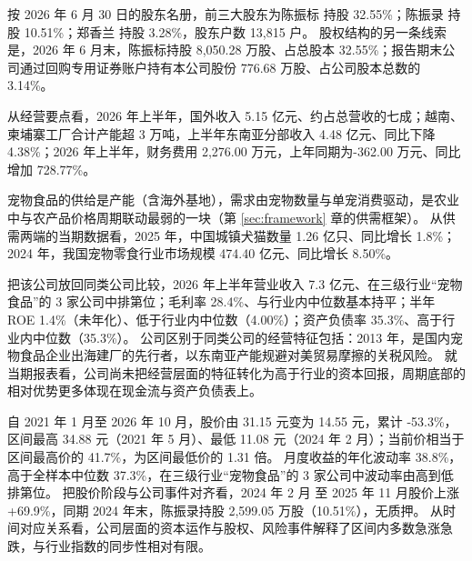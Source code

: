  按 2026 年 6 月 30 日的股东名册，前三大股东为陈振标 持股 32.55\%；陈振录 持股 10.51\%；郑香兰 持股 3.28\%，股东户数 13,815 户。 股权结构的另一条线索是，2026 年 6 月末，陈振标持股 8,050.28 万股、占总股本 32.55\%；报告期末公司通过回购专用证券账户持有本公司股份 776.68 万股、占公司股本总数的 3.14\%。

 从经营要点看，2026 年上半年，国外收入 5.15 亿元、约占总营收的七成；越南、柬埔寨工厂合计产能超 3 万吨，上半年东南亚分部收入 4.48 亿元、同比下降 4.38\%；2026 年上半年，财务费用 2,276.00 万元，上年同期为-362.00 万元、同比增加 728.77\%。

 宠物食品的供给是产能（含海外基地），需求由宠物数量与单宠消费驱动，是农业中与农产品价格周期联动最弱的一块（第 \ref{sec:framework} 章的供需框架）。 从供需两端的当期数据看，2025 年，中国城镇犬猫数量 1.26 亿只、同比增长 1.8\%；2024 年，我国宠物零食行业市场规模 474.40 亿元、同比增长 8.50\%。

 把该公司放回同类公司比较，2026 年上半年营业收入 7.3 亿元、在三级行业“宠物食品”的 3 家公司中排第位；毛利率 28.4\%、与行业内中位数基本持平；半年 ROE 1.4\%（未年化）、低于行业内中位数（4.00\%）；资产负债率 35.3\%、高于行业内中位数（35.3\%）。 公司区别于同类公司的经营特征包括：2013 年，是国内宠物食品企业出海建厂的先行者，以东南亚产能规避对美贸易摩擦的关税风险。 就当期报表看，公司尚未把经营层面的特征转化为高于行业的资本回报，周期底部的相对优势更多体现在现金流与资产负债表上。

 自 2021 年 1 月至 2026 年 10 月，股价由 31.15 元变为 14.55 元，累计 -53.3\%，区间最高 34.88 元（2021 年 5 月）、最低 11.08 元（2024 年 2 月）；当前价相当于区间最高价的 41.7\%，为区间最低价的 1.31 倍。 月度收益的年化波动率 38.8\%，高于全样本中位数 37.3\%，在三级行业“宠物食品”的 3 家公司中波动率由高到低排第位。 把股价阶段与公司事件对齐看，2024 年 2 月 至 2025 年 11 月股价上涨+69.9\%，同期 2024 年末，陈振录持股 2,599.05 万股（10.51\%），无质押。 从时间对应关系看，公司层面的资本运作与股权、风险事件解释了区间内多数急涨急跌，与行业指数的同步性相对有限。


